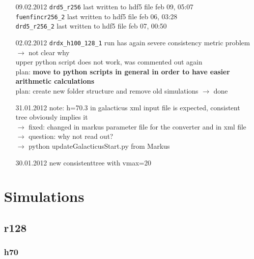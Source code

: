 \documentclass[a4paper,11pt,fleqn,oneside]{book}
\begin{document}
\begin{itemize}
\item[09.02.2012]
\texttt{drd5\_r256} last written to hdf5 file feb 09, 05:07 \\
\texttt{fuenfincr256\_2} last written to hdf5 file feb 06, 03:28 \\
\texttt{drd5\_r256\_2} last written to hdf5 file feb 07, 00:50 \\

\item[02.02.2012]
\texttt{drdx\_h100\_128\_1} run has again severe consistency 
metric problem \\ $\rightarrow$ not clear why \\
upper python script does not work, was commented out again \\
plan: \textbf{move to python scripts in general in order to have
 easier arithmetic calculations} \\   
plan: create new folder structure and remove old simulations $\rightarrow$ done \\

\item[31.01.2012]
note: h=70.3 in galacticus xml input file is expected, consistent tree obviously implies it \\
$\rightarrow$ fixed: changed in markus parameter file for the converter and in xml file \\
$\rightarrow$ question: why not read out? \\
$\rightarrow$ python updateGalacticusStart.py from Markus 

\item[30.01.2012]
new consistenttree with vmax=20



\end{itemize}

\chapter{Simulations} %

\section{r128} %

\subsection{h70} %
\end{document}
